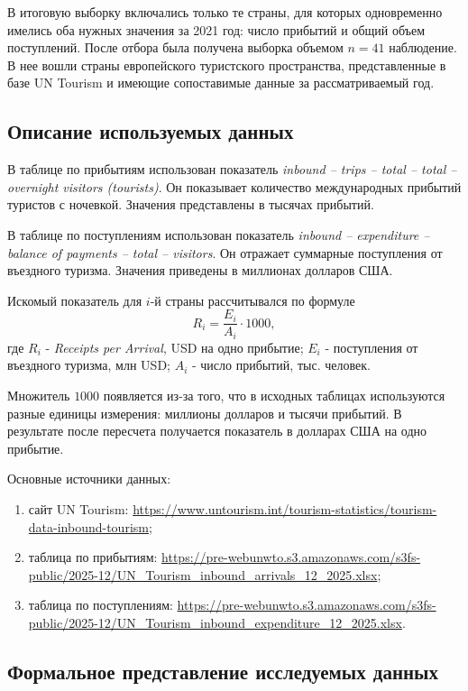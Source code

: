\documentclass[14pt,a4paper]{extarticle}
\begin{document}
В итоговую выборку включались только те страны, для которых одновременно имелись оба нужных значения за 2021 год: число прибытий и общий объем поступлений. После отбора была получена выборка объемом $n=41$ наблюдение. В нее вошли страны европейского туристского пространства, представленные в базе UN Tourism и имеющие сопоставимые данные за рассматриваемый год.

\subsection{Описание используемых данных}

В таблице по прибытиям использован показатель \textit{inbound -- trips -- total -- total -- overnight visitors (tourists)}. Он показывает количество международных прибытий туристов с ночевкой. Значения представлены в тысячах прибытий.

В таблице по поступлениям использован показатель \textit{inbound -- expenditure -- balance of payments -- total -- visitors}. Он отражает суммарные поступления от въездного туризма. Значения приведены в миллионах долларов США.

Искомый показатель для $i$-й страны рассчитывался по формуле
\begin{equation}
R_i = \frac{E_i}{A_i} \cdot 1000,
\end{equation}
где $R_i$ - \textit{Receipts per Arrival}, USD на одно прибытие; $E_i$ - поступления от въездного туризма, млн USD; $A_i$ - число прибытий, тыс. человек.

Множитель $1000$ появляется из-за того, что в исходных таблицах используются разные единицы измерения: миллионы долларов и тысячи прибытий. В результате после пересчета получается показатель в долларах США на одно прибытие.

Основные источники данных:
\begin{enumerate}[leftmargin=1.25cm]
    \item сайт UN Tourism: \url{https://www.untourism.int/tourism-statistics/tourism-data-inbound-tourism};
    \item таблица по прибытиям: \url{https://pre-webunwto.s3.amazonaws.com/s3fs-public/2025-12/UN_Tourism_inbound_arrivals_12_2025.xlsx};
    \item таблица по поступлениям: \url{https://pre-webunwto.s3.amazonaws.com/s3fs-public/2025-12/UN_Tourism_inbound_expenditure_12_2025.xlsx}.
\end{enumerate}

\subsection{Формальное представление исследуемых данных}
\end{document}
